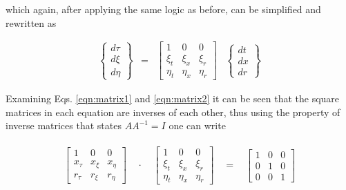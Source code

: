 	which again, after applying the same logic as before, can be simplified and rewritten as

\begin{equation}
	\begin{array}{cccc}
		\left\{
		\begin{array}{c}
		d\tau \\ d\xi \\ d\eta 
		\end{array} 
		\right\}
		& = &
		\left[
		\begin{array}{ccc}
		1 & 0 & 0 \\ \xi_t & \xi_x & \xi_r \\ \eta_t & \eta_x & \eta_r 
		\end{array}
		\right] 
		&
		\left\{
		\begin{array}{c}
		dt \\ dx \\ dr 
		\end{array}
		\right\}
	\end{array} 
\label{eqn:matrix2}
\end{equation}

	Examining Eqs. \ref{eqn:matrix1} and \ref{eqn:matrix2} it can be seen that the square matrices in 
each equation are inverses of each other, thus using the property of inverse matrices that states $AA^{-1} = I$ one can
write

\begin{equation}
\begin{array}{ccccc}
	\begin{array}{c}
		\left[
		\begin{array}{ccc}
		1 & 0 & 0 \\ x_{\tau} & x_{\xi} & x_{\eta} \\ r_{\tau} & r_{\xi} & r_{\eta} 
		\end{array}
		\right] 
	\end{array} 
& \cdot  &
	\begin{array}{c}
		\left[
		\begin{array}{ccc}
		1 & 0 & 0 \\ \xi_t & \xi_x & \xi_r \\ \eta_t & \eta_x & \eta_r 
		\end{array}
		\right] 
	\end{array}
& = &
	\begin{array}{c}
		\left[
		\begin{array}{ccc}
		1 & 0 & 0 \\ 0 & 1 & 0 \\ 0 & 0 & 1
		\end{array}
		\right]
	\end{array}
\end{array}
\label{eqn:identity} 
\end{equation}

